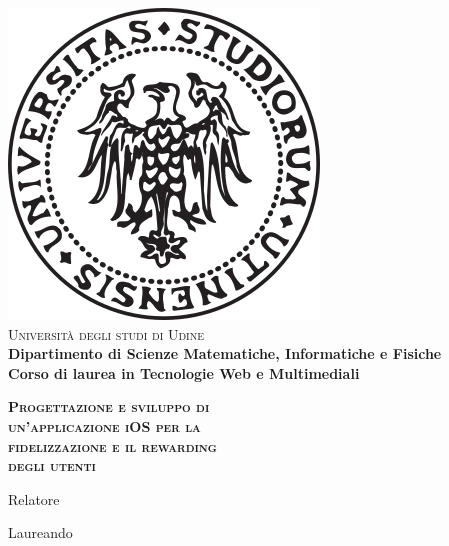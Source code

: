 \begin{titlepage}
\begin{center}
    \includegraphics[scale=0.35]{logo}\\
    \vspace{8mm}
    {\huge{\textsc{\textmd{Università degli studi di Udine}}}}\\
    \vspace{10mm}
    {\large{\textbf{ Dipartimento di Scienze Matematiche, Informatiche e Fisiche}}}\\
    \vspace{0.5cm}
    {\large{\textbf{ Corso di laurea in Tecnologie Web e Multimediali}}}
\end{center}
\vspace{10mm}
\begin{center}
    {\LARGE\textbf{\textsc{Progettazione e sviluppo di}}}\\
    \vspace{6mm}
    {\LARGE\textbf{\textsc{un'applicazione iOS per la}}}\\
    \vspace{6mm}
    {\LARGE\textbf{\textsc{fidelizzazione e il rewarding}}}\\
    \vspace{6mm}
    {\LARGE\textsc{\textbf{degli utenti}}}\\
    \vspace{10mm}
\end{center}
\vfill
\par
\noindent

\begin{minipage}[t]{0.47\textwidth}
    \vspace{13mm}
    \large{\sc Relatore}\\
\end{minipage}
\hfill
\noindent
\begin{minipage}[t]{0.47\textwidth}\raggedleft
    \vspace{13mm}
    \large{\sc Laureando}\\
\end{minipage}


\end{titlepage}
